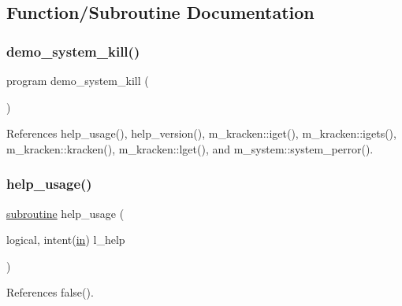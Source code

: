 \subsection{Function/\+Subroutine Documentation}
\mbox{\label{__kill_8f90_ad2550a0eb8119ef21d3febfe883f2051}} 
\subsubsection{\texorpdfstring{demo\+\_\+system\+\_\+kill()}{demo\_system\_kill()}}
{\footnotesize\ttfamily program demo\+\_\+system\+\_\+kill (\begin{DoxyParamCaption}{ }\end{DoxyParamCaption})}



References help\+\_\+usage(), help\+\_\+version(), m\+\_\+kracken\+::iget(), m\+\_\+kracken\+::igets(), m\+\_\+kracken\+::kracken(), m\+\_\+kracken\+::lget(), and m\+\_\+system\+::system\+\_\+perror().

\mbox{\label{__kill_8f90_a3e09a3b52ee8fb04eeb93fe5761626a8}} 
\subsubsection{\texorpdfstring{help\+\_\+usage()}{help\_usage()}}
{\footnotesize\ttfamily \hyperlink{M__stopwatch_83_8txt_acfbcff50169d691ff02d4a123ed70482}{subroutine} help\+\_\+usage (\begin{DoxyParamCaption}\item[{logical, intent(\hyperlink{M__journal_83_8txt_afce72651d1eed785a2132bee863b2f38}{in})}]{l\+\_\+help }\end{DoxyParamCaption})}



References false().

\mbox{\label{__kill_8f90_a39c21619b08a3c22f19e2306efd7f766}} 
